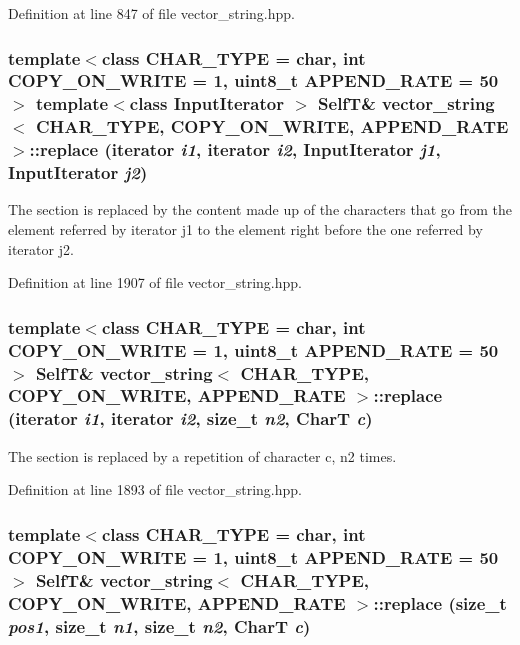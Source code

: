 Definition at line 847 of file vector\_\-string.hpp.\hypertarget{classvector__string_081f3ca5b6aa4391a5dc2316f2647073}{
\subsubsection[{replace}]{\setlength{\rightskip}{0pt plus 5cm}template$<$class CHAR\_\-TYPE  = char, int COPY\_\-ON\_\-WRITE = 1, uint8\_\-t APPEND\_\-RATE = 50$>$ template$<$class InputIterator $>$ {\bf SelfT}\& {\bf vector\_\-string}$<$ CHAR\_\-TYPE, COPY\_\-ON\_\-WRITE, APPEND\_\-RATE $>$::replace (iterator {\em i1}, \/  iterator {\em i2}, \/  InputIterator {\em j1}, \/  InputIterator {\em j2})}}
\label{classvector__string_081f3ca5b6aa4391a5dc2316f2647073}


The section is replaced by the content made up of the characters that go from the element referred by iterator j1 to the element right before the one referred by iterator j2. 

Definition at line 1907 of file vector\_\-string.hpp.\hypertarget{classvector__string_001d31babf69110da340488c9f37aec2}{
\subsubsection[{replace}]{\setlength{\rightskip}{0pt plus 5cm}template$<$class CHAR\_\-TYPE  = char, int COPY\_\-ON\_\-WRITE = 1, uint8\_\-t APPEND\_\-RATE = 50$>$ {\bf SelfT}\& {\bf vector\_\-string}$<$ CHAR\_\-TYPE, COPY\_\-ON\_\-WRITE, APPEND\_\-RATE $>$::replace (iterator {\em i1}, \/  iterator {\em i2}, \/  size\_\-t {\em n2}, \/  CharT {\em c})}}
\label{classvector__string_001d31babf69110da340488c9f37aec2}


The section is replaced by a repetition of character c, n2 times. 

Definition at line 1893 of file vector\_\-string.hpp.\hypertarget{classvector__string_00e7aaca1b2d5d06fbf58889de59b417}{
\subsubsection[{replace}]{\setlength{\rightskip}{0pt plus 5cm}template$<$class CHAR\_\-TYPE  = char, int COPY\_\-ON\_\-WRITE = 1, uint8\_\-t APPEND\_\-RATE = 50$>$ {\bf SelfT}\& {\bf vector\_\-string}$<$ CHAR\_\-TYPE, COPY\_\-ON\_\-WRITE, APPEND\_\-RATE $>$::replace (size\_\-t {\em pos1}, \/  size\_\-t {\em n1}, \/  size\_\-t {\em n2}, \/  CharT {\em c})}}
\label{classvector__string_00e7aaca1b2d5d06fbf58889de59b417}


